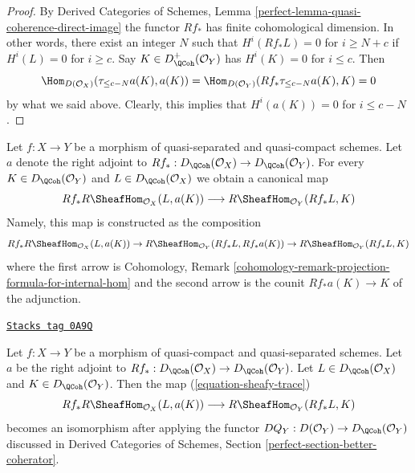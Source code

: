 \begin{proof}
By Derived Categories of Schemes, Lemma
\ref{perfect-lemma-quasi-coherence-direct-image}
the functor $Rf_*$ has finite cohomological dimension. In other words,
there exist an integer $N$ such that
$H^i(Rf_*L) = 0$ for $i \geq N + c$ if $H^i(L) = 0$ for $i \geq c$.
Say $K \in D^+_\QCoh(\mathcal{O}_Y)$ has $H^i(K) = 0$ for $i \leq c$.
Then
$$
\Hom_{D(\mathcal{O}_X)}(\tau_{\leq c - N}a(K), a(K)) =
\Hom_{D(\mathcal{O}_Y)}(Rf_*\tau_{\leq c - N}a(K), K) = 0
$$
by what we said above. Clearly, this implies that
$H^i(a(K)) = 0$ for $i \leq c - N$.
\end{proof}

Let $f : X \to Y$ be a morphism of quasi-separated and quasi-compact
schemes. Let $a$ denote the right adjoint to
$Rf_* : D_\QCoh(\mathcal{O}_X) \to D_\QCoh(\mathcal{O}_Y)$. For every
$K \in D_\QCoh(\mathcal{O}_Y)$ and $L \in D_\QCoh(\mathcal{O}_X)$
we obtain a canonical map
\begin{equation}
\label{equation-sheafy-trace}
Rf_*R\SheafHom_{\mathcal{O}_X}(L, a(K))
\longrightarrow
R\SheafHom_{\mathcal{O}_Y}(Rf_*L, K)
\end{equation}
Namely, this map is constructed as the composition
$$
Rf_*R\SheafHom_{\mathcal{O}_X}(L, a(K)) \to
R\SheafHom_{\mathcal{O}_Y}(Rf_*L, Rf_*a(K)) \to
R\SheafHom_{\mathcal{O}_Y}(Rf_*L, K)
$$
where the first arrow is
Cohomology, Remark
\ref{cohomology-remark-projection-formula-for-internal-hom}
and the second arrow is the counit $Rf_*a(K) \to K$ of the adjunction.

\begin{lemma}
\label{duality-lemma-iso-on-RSheafHom}
\href{https://stacks.math.columbia.edu/tag/0A9Q}{\texttt{Stacks tag 0A9Q}}

Let $f : X \to Y$ be a morphism of quasi-compact and quasi-separated schemes.
Let $a$ be the right adjoint to
$Rf_* : D_\QCoh(\mathcal{O}_X) \to D_\QCoh(\mathcal{O}_Y)$.
Let $L \in D_\QCoh(\mathcal{O}_X)$ and $K \in D_\QCoh(\mathcal{O}_Y)$.
Then the map (\ref{equation-sheafy-trace})
$$
Rf_*R\SheafHom_{\mathcal{O}_X}(L, a(K))
\longrightarrow
R\SheafHom_{\mathcal{O}_Y}(Rf_*L, K)
$$
becomes an isomorphism after applying the functor
$DQ_Y : D(\mathcal{O}_Y) \to D_\QCoh(\mathcal{O}_Y)$
discussed in Derived Categories of Schemes, Section
\ref{perfect-section-better-coherator}.
\end{lemma}

